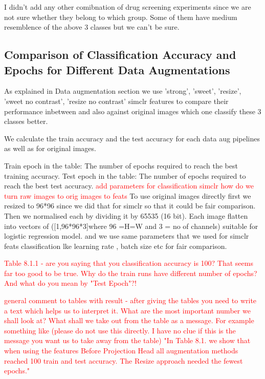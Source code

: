 I didn't add any other comibnation of drug screening experiments since we are not sure whether they belong to which group. Some of them have medium resemblence of the
 above 3 classes but we can't be sure.


\subsection{Comparison of Classification Accuracy and Epochs for Different Data Augmentations}

As explained in Data augmentation section we use  'strong', 'sweet', 'resize', 'sweet no contrast', 'resize no contrast' simclr features to compare their performance inbetween
 and also against original images which one classify these 3 classes better.

We calculate the train accuracy and the test accuracy for each data aug pipelines as well as for original images.

Train epoch in the table: The number of epochs required to reach the best training accuracy.
Test epoch in the table: The number of epochs required to reach the best test accuracy.
\textcolor{red}{add parameters for classification simclr}
\textcolor{red}{how do we turn raw images to orig images to feats}
To use original images directly first we resized to 96*96 since we did that for simclr so that it could be fair comparison. Then we normalised each by dividing it by 65535 
(16 bit). Each image flatten into vectors of ([1,96*96*3]where 96 =H=W and 3 = no of channels) suitable for logistic regression model. and we use same parameters that we used 
for simclr feats classification lke learning rate , batch size etc for fair comparison.


\textcolor{red}{Table 8.1.1 - are you saying that you classification accuracy is 100?
 That seems far too good to be true. Why do the train runs have different number of epochs? And what do you mean by "Test Epoch"?!}


 \textcolor{red}{general comment to tables with result - after giving the tables you need to write a text which helps us to interpret it. What are the most important 
 number we shall look at? What shall we take out from the table as a message. For example something like (please do not use this directly. I have no clue 
 if this is the message you want us to take away from the table) "In Table 8.1. we show that when using the features Before Projection Head all 
 augmentation methods reached 100 train and test accuracy. The Resize approach needed the fewest epochs."}
    
